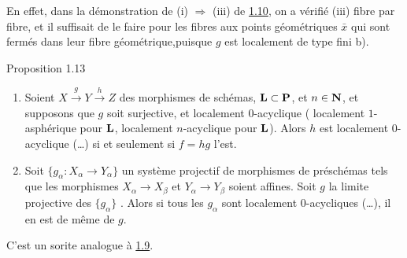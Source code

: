 \documentclass[10pt]{../fichiers-configuration-latex/smfart}
\begin{document}
En effet, dans la démonstration de (i) $\Rightarrow$ (iii) de \hyperref[XV.prop1.10]{1.10}, on
a vérifié (iii) fibre par fibre, et il suffisait de le faire pour les
fibres aux points géométriques $\bar{x}$ qui sont fermés dans leur
fibre géométrique,\pageoriginale puisque $g$ est localement de type
fini  b).

\begin{enonce*}{Proposition 1.13}
\begin{enumerate}
\renewcommand{\theenumi}{\roman{enumi}}
\renewcommand{\labelenumi}{(\theenumi)}
\item Soient $X\xrightarrow{g}Y\xrightarrow{h}Z$ des morphismes de
schémas, $\mathbf{L}\subset \mathbf{P}$, et $n\in \mathbf{N}$, et
supposons que $g$ soit surjective, et localement $0$-acyclique (\resp
localement $1$-asphérique pour $\mathbf{L}$, \resp localement
$n$-acyclique pour $\mathbf{L}$). Alors $h$ est localement
$0$-acyclique (\resp\ldots) si et seulement si $f=hg$ l'est.

\item Soit $\{g_{\alpha}:X_{\alpha}\rightarrow Y_{\alpha}\}$ un
système projectif de morphismes de préschémas tels que les morphismes
$X_{\alpha}\rightarrow X_{\beta}$ et $Y_{\alpha}\rightarrow Y_{\beta}$
soient affines. Soit $g$ la limite projective des $\{g_{\alpha}\}$
.
Alors si tous les $g_{\alpha}$ sont localement
$0$-acycliques (\resp\ldots), il en est de même de $g$.
\end{enumerate}
\end{enonce*}

C'est un sorite analogue à \hyperref[XV.prop1.9]{1.9}.
\end{document}
